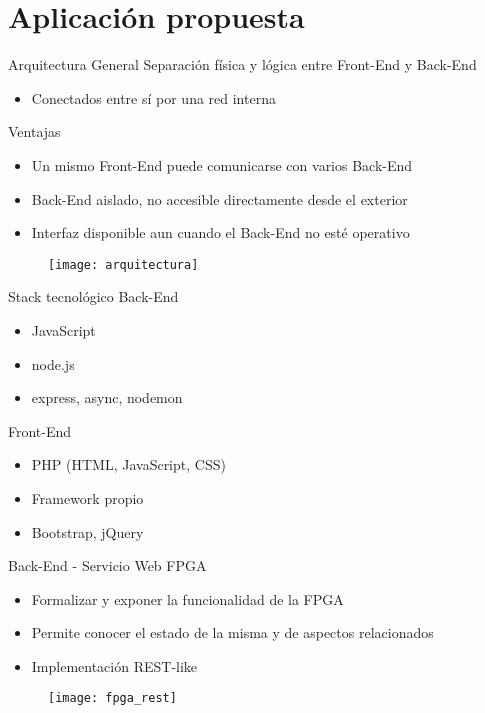 \section{Aplicación propuesta}

\begin{frame}{Arquitectura General}
  Separación física y lógica entre Front-End y Back-End
  \begin{itemize}
    \item Conectados entre sí por una red interna
  \end{itemize}
  Ventajas
  \begin{itemize}
    \item Un mismo Front-End puede comunicarse con varios Back-End
    \item Back-End aislado, no accesible directamente desde el exterior
    \item Interfaz disponible aun cuando el Back-End no esté operativo
  \end{itemize}
  \begin{figure}
    \texttt{[image: arquitectura]}
  \end{figure}
\end{frame}

\begin{frame}{Stack tecnológico}
  Back-End
  \begin{itemize}
    \item JavaScript
    \item node.js
    \item express, async, nodemon
  \end{itemize}
  Front-End
  \begin{itemize}
    \item PHP (HTML, JavaScript, CSS)
    \item Framework propio
    \item Bootstrap, jQuery
  \end{itemize}
\end{frame}

\begin{frame}{Back-End - Servicio Web FPGA}
  \begin{itemize}
    \item Formalizar y exponer la funcionalidad de la FPGA
    \item Permite conocer el estado de la misma y de aspectos relacionados
    \item Implementación REST-like
  \end{itemize}
  \begin{figure}
    \texttt{[image: fpga\_rest]}
  \end{figure}
\end{frame}

